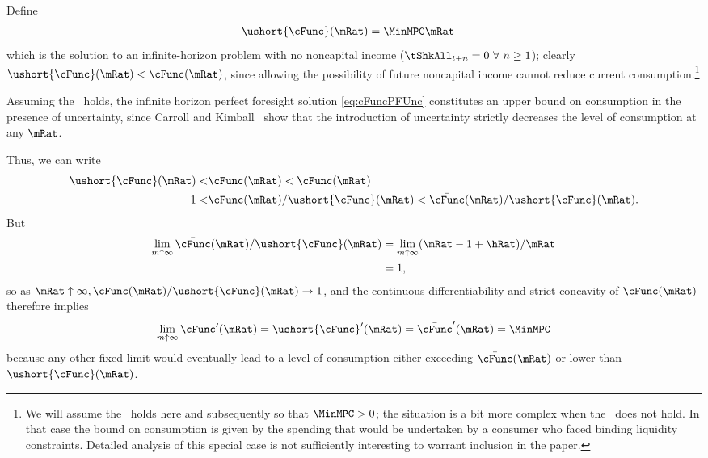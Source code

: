 \documentclass[./BufferStockTheory.tex]{subfiles}
\begin{document}
Define
\begin{equation}\begin{gathered}\begin{aligned}
   \ushort{\cFunc}(\mRat)  & = \MinMPC \mRat \nonumber
\end{aligned}\end{gathered}\end{equation}
which is the solution to an infinite-horizon problem with no noncapital
income
($\tShkAll_{t+n} = 0~\forall~n\geq1$); 
  clearly $\ushort{\cFunc}(\mRat)
< \cFunc(\mRat)$, since allowing the possibility of future noncapital
income cannot reduce current consumption.\footnote{We will assume the
  \RIC~holds here and subsequently so that $\MinMPC > 0$; the situation
  is a bit more complex when the \RIC~does not hold.   In that case the bound on consumption is given by the spending
  that would be undertaken by a consumer who faced binding liquidity
  constraints.  Detailed analysis of this special case is not
  sufficiently interesting to warrant inclusion in the paper.}

Assuming the \FHWC~holds, the infinite horizon perfect
foresight solution \eqref{eq:cFuncPFUnc} constitutes an upper
bound on consumption in the presence of uncertainty, since Carroll and
Kimball~\citeyearpar{ckConcavity} show that the introduction of
uncertainty strictly decreases the level of consumption at any $\mRat$.

Thus, we can write
\begin{equation}\begin{gathered}\begin{aligned}  
\ushort{\cFunc}(\mRat) < & \cFunc(\mRat)  < \bar{\cFunc}(\mRat) \label{eq:lowerltupper} \\
1 < & \cFunc(\mRat)/\ushort{\cFunc}(\mRat)  < \bar{\cFunc}(\mRat)/\ushort{\cFunc}(\mRat). \nonumber
\end{aligned}\end{gathered}\end{equation}
But
\begin{equation}\begin{gathered}\begin{aligned}  \label{eq:limitlowerupper}
\lim_{m \uparrow \infty} \bar{\cFunc}(\mRat)/\ushort{\cFunc}(\mRat) 
& = \lim_{m \uparrow \infty} (\mRat -1+ \hRat)/\mRat \nonumber \\
 & = 1, \nonumber
\end{aligned}\end{gathered}\end{equation}
so as $\mRat \uparrow \infty, \cFunc(\mRat)/\ushort{\cFunc}(\mRat)
\rightarrow 1$, and the continuous differentiability and strict
concavity of $\cFunc(\mRat)$ therefore implies
\begin{equation}  \label{eq:limxtoinftycp}
\lim_{m \uparrow \infty} \cFunc^{\prime}(\mRat) =
\ushort{\cFunc}^{\prime}(\mRat) = \bar{\cFunc}^{\prime}(\mRat) = \MinMPC \notag
\end{equation}
because any other fixed limit would eventually lead to a level of
consumption either exceeding $\bar{\cFunc}(\mRat)$ or lower than
$\ushort{\cFunc}(\mRat)$.
\end{document}
